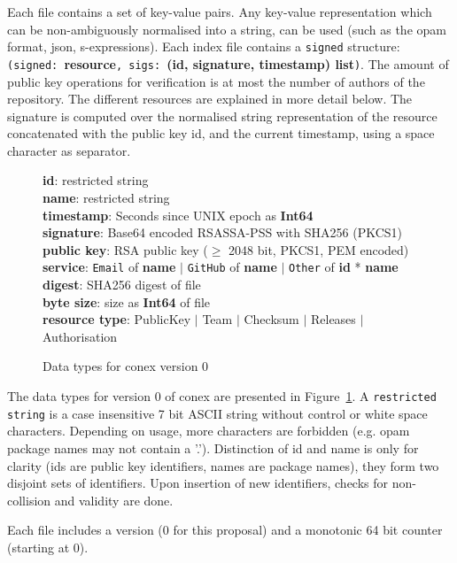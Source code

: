 \documentclass[nocopyrightspace]{sigplanconf}
\begin{document}
Each file contains a set of key-value pairs.
Any key-value representation which can be non-ambiguously normalised into a string, can be used (such as the opam format, json, s-expressions).
Each index file contains a \texttt{signed} structure: \texttt{(signed: }\textbf{resource}\texttt{, sigs: }\textbf{(id, signature, timestamp) list}\texttt{)}.
The amount of public key operations for verification is at most the number of authors of the repository.
The different resources are explained in more detail below.
The signature is computed over the normalised string representation of the resource concatenated with the public key id, and the current timestamp, using a space character as separator.

\begin{figure}[h]
\textbf{id}: restricted string\\
\textbf{name}: restricted string\\
\textbf{timestamp}: Seconds since UNIX epoch as \textbf{Int64}\\
\textbf{signature}: Base64 encoded RSASSA-PSS with SHA256 (PKCS1)\\
\textbf{public key}: RSA public key ($\geq$ 2048 bit, PKCS1, PEM encoded)\\
\textbf{service}: \texttt{Email} of \textbf{name} $|$ \texttt{GitHub} of \textbf{name} $|$ \texttt{Other} of \textbf{id} * \textbf{name}\\
\textbf{digest}: SHA256 digest of file\\
\textbf{byte size}: size as \textbf{Int64} of file\\
\textbf{resource type}: PublicKey $|$ Team $|$ Checksum $|$ Releases $|$ Authorisation
\caption{\label{fig:datatypes0}
  Data types for conex version 0}
\end{figure}

The data types for version 0 of conex are presented in Figure~\ref{fig:datatypes0}.
A \texttt{restricted string} is a case insensitive 7 bit ASCII string without control or white space characters.
Depending on usage, more characters are forbidden (e.g. opam package names may not contain a '.').
Distinction of id and name is only for clarity (ids are public key identifiers, names are package names), they form two disjoint sets of identifiers.
Upon insertion of new identifiers, checks for non-collision and validity are done.

Each file includes a version (0 for this proposal) and a monotonic 64 bit counter (starting at 0).
\end{document}
